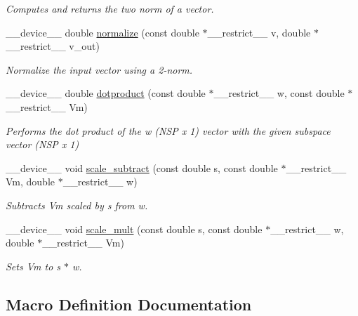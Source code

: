 \begin{DoxyCompactItemize}
\begin{DoxyCompactList}\small\item\em Computes and returns the two norm of a vector. \end{DoxyCompactList}\item 
\+\_\+\+\_\+device\+\_\+\+\_\+ double \hyperlink{exponential__linear__algebra_8cuh_ae01ed1392756734c2d6996554cb20176}{normalize} (const double $\ast$\+\_\+\+\_\+restrict\+\_\+\+\_\+ v, double $\ast$\+\_\+\+\_\+restrict\+\_\+\+\_\+ v\+\_\+out)
\begin{DoxyCompactList}\small\item\em Normalize the input vector using a 2-\/norm. \end{DoxyCompactList}\item 
\+\_\+\+\_\+device\+\_\+\+\_\+ double \hyperlink{exponential__linear__algebra_8cuh_a43b8d535f44e58015de9b6ea37561bd7}{dotproduct} (const double $\ast$\+\_\+\+\_\+restrict\+\_\+\+\_\+ w, const double $\ast$\+\_\+\+\_\+restrict\+\_\+\+\_\+ Vm)
\begin{DoxyCompactList}\small\item\em Performs the dot product of the w (N\+SP x 1) vector with the given subspace vector (N\+SP x 1) \end{DoxyCompactList}\item 
\+\_\+\+\_\+device\+\_\+\+\_\+ void \hyperlink{exponential__linear__algebra_8cuh_a6b815eec17077505cb9313d6c380e036}{scale\+\_\+subtract} (const double s, const double $\ast$\+\_\+\+\_\+restrict\+\_\+\+\_\+ Vm, double $\ast$\+\_\+\+\_\+restrict\+\_\+\+\_\+ w)
\begin{DoxyCompactList}\small\item\em Subtracts Vm scaled by s from w. \end{DoxyCompactList}\item 
\+\_\+\+\_\+device\+\_\+\+\_\+ void \hyperlink{exponential__linear__algebra_8cuh_a5349e6f114398db5a19e212fc837f670}{scale\+\_\+mult} (const double s, const double $\ast$\+\_\+\+\_\+restrict\+\_\+\+\_\+ w, double $\ast$\+\_\+\+\_\+restrict\+\_\+\+\_\+ Vm)
\begin{DoxyCompactList}\small\item\em Sets Vm to s $\ast$ w. \end{DoxyCompactList}\end{DoxyCompactItemize}


\subsection{Macro Definition Documentation}
